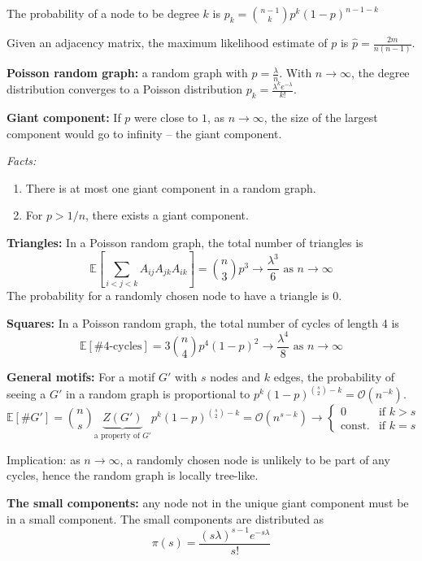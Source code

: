 \documentclass[12pt]{article}
\begin{document}
The probability of a node to be degree $k$ is $p_k = \binom{n-1}{k} p^k (1-p)^{n-1-k}$

Given an adjacency matrix, the maximum likelihood estimate of $p$ is $\hat{p} = \frac{2m}{n(n-1)}$.

\textbf{Poisson random graph:} a random graph with $p = \frac{\lambda}{n}$. With $n \to \infty$, the degree distribution converges to a Poisson distribution $p_k = \frac{\lambda^k e^{-\lambda}}{k!}$.

\textbf{Giant component:} If $p$ were close to $1$, as $n \to \infty$, the size of the largest component would go to infinity -- the giant component.

\textit{Facts:}
\begin{enumerate}
    \item There is at most one giant component in a random graph.
    \item For $p > 1/n$, there exists a giant component.
\end{enumerate}

\textbf{Triangles:} In a Poisson random graph, the total number of triangles is
$$
\mathbb{E}\left[\sum_{i<j<k} A_{ij} A_{jk} A_{ik}\right] = \binom{n}{3} p^3 \rightarrow \frac{\lambda^3}{6} \text{ as } n \to \infty
$$
The probability for a randomly chosen node to have a triangle is 0.

\textbf{Squares:} In a Poisson random graph, the total number of cycles of length 4 is
$$
\mathbb{E}[\text{\#4-cycles}] = 3\binom{n}{4} p^4 (1-p)^2 \rightarrow \frac{\lambda^4}{8} \text{ as } n \to \infty
$$

\textbf{General motifs:} For a motif $G'$ with $s$ nodes and $k$ edges, the probability of seeing a $G'$ in a random graph is proportional to $p^k (1-p)^{\binom{s}{2} - k}  = \mathcal{O}(n^{-k})$.
$$
\mathbb{E}[\# G'] = \binom{n}{s} \underbrace{Z(G')}_{\text{a property of $G'$}} p^k (1-p)^{\binom{s}{2} - k} = \mathcal{O}(n^{s-k}) \rightarrow
\begin{cases}
0 & \text{if } k > s \\
\text{const.} & \text{if } k = s
\end{cases}
$$

Implication: as $n \to \infty$, a randomly chosen node is unlikely to be part of any cycles, hence the random graph is locally tree-like.

\textbf{The small components:} any node not in the unique giant component must be in a small component. The small components are distributed as 
$$
\pi (s) = \frac{(s\lambda)^{s-1} e^{-s\lambda}}{s!}
$$
\end{document}
